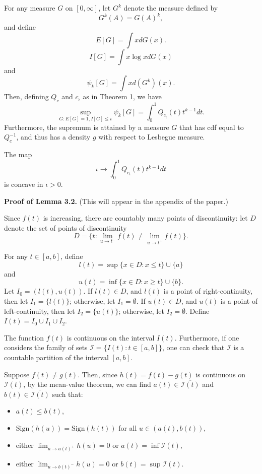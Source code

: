 \documentclass[12pt]{article}
\begin{document}
\begin{lemma}
For any measure $G$ on $[0, \infty]$,
let $G^k$ denote the measure defined by
\[
G^k(A) = G(A)^k,
\]
and define
\[
E[G] = \int x dG(x).
\]
\[
I[G] = \int x \log x dG(x)
\]
and
\[
\psi_k[G] = \int x d(G^k)(x).
\]
Then, defining $Q_c$ and $c_\iota$ as in Theorem 1, we have
\[
\sup_{G: E[G] = 1, I[G] \leq \iota} \psi_k[G] = \int_0^1 Q_{c_\iota}(t) t^{k-1} dt.
\]
Furthermore, the supremum is attained by a measure $G$ that has cdf
equal to $Q_c^{-1}$, and thus has a density $g$ with respect to
Lesbegue measure.
\end{lemma}


\begin{lemma}
The map
\[
\iota \to \int_0^1 Q_{c_\iota}(t) t^{k-1} dt
\]
is concave in $\iota > 0$.
\end{lemma}

\textbf{Proof of Lemma 3.2.} (This will appear in the appendix of the paper.)

Since $f(t)$ is increasing, there are countably many points of discontinuity: let $D$ denote the set of points of discontinuity
\[
D = \{t: \lim_{u \to t^-} f(t) \neq \lim_{u \to t^+} f(t)\}.
\]

For any $t \in [a,b]$, define
\[
l(t) = \sup \{x \in D: x \leq t\} \cup \{a\}
\]
and
\[
u(t) = \inf \{x \in D: x \geq t\} \cup \{b\}.
\]
Let $I_0 = (l(t), u(t))$.
If $l(t) \in D$, and $l(t)$ is a point of right-continuity, then let $I_1 = \{l(t)\}$; otherwise, let $I_1 = \emptyset$.
If $u(t) \in D$, and $u(t)$ is a point of left-continuity, then let $I_2 = \{u(t)\}$; otherwise, let $I_2 = \emptyset$.
Define $I(t) = I_0 \cup I_1 \cup I_2$.

The function $f(t)$ is continuous on the interval $I(t)$. Furthermore,
if one considers the family of sets $\mathcal{I} = \{I(t): t \in
[a,b]\}$, one can check that $\mathcal{I}$ is a countable partition of the interval
$[a,b]$.

Suppose $f(t) \neq g(t)$.  Then, since $h(t) = f(t) - g(t)$ is
continuous on $\mathcal{I}(t)$, by the mean-value theorem, we can find $a(t) \in \overline{\mathcal{I}(t)}$ and $b(t) \in \overline{\mathcal{I}(t)}$
such that:
\begin{itemize}
\item $a(t) \leq b(t)$,
\item $\text{Sign}(h(u)) = \text{Sign}(h(t))$ for all $u \in (a(t), b(t))$,
\item either $\lim_{u \to a(t)^+} h(u) = 0$ or $a(t) = \inf \mathcal{I}(t)$,
\item either $\lim_{u \to b(t)^-} h(u) = 0$ or $b(t) = \sup \mathcal{I}(t)$.
\end{itemize}
\end{document}
